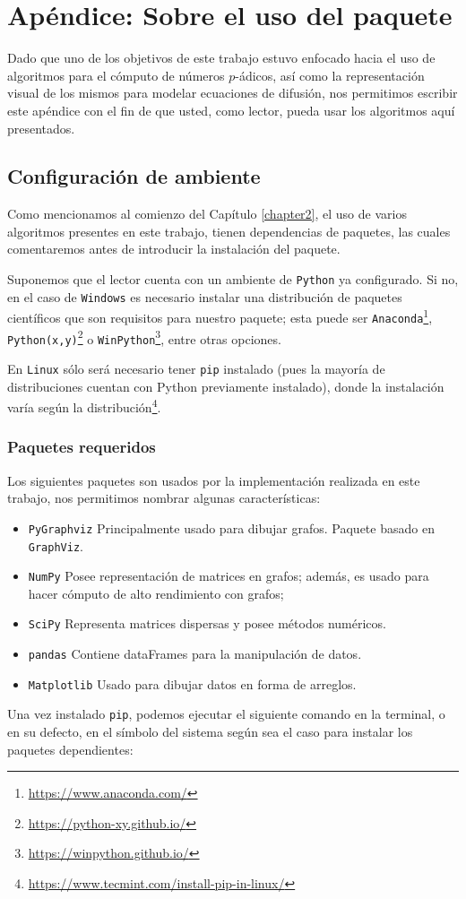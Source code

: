 \chapter{Apéndice: Sobre el uso del paquete}
\label{apendice}
Dado que uno de los objetivos de este trabajo estuvo enfocado hacia el uso de algoritmos para el cómputo de números $p$-ádicos, así como la representación visual de los mismos para modelar ecuaciones de difusión, nos permitimos escribir este apéndice con el fin de que usted, como lector, pueda usar los algoritmos aquí presentados.
\section{Configuración de ambiente}
Como mencionamos al comienzo del Capítulo \ref{chapter2}, el uso de varios algoritmos presentes en este trabajo, tienen dependencias de paquetes, las cuales comentaremos antes de introducir la instalación del paquete.

Suponemos que el lector cuenta con un ambiente de \texttt{Python} ya configurado. Si no, en el caso de \texttt{Windows} es necesario instalar una distribución de paquetes científicos que son requisitos para nuestro paquete; esta puede ser \texttt{Anaconda}\footnote{\url{https://www.anaconda.com/}}, \texttt{Python(x,y)}\footnote{\url{https://python-xy.github.io/}} o \texttt{WinPython}\footnote{\url{https://winpython.github.io/}}, entre otras opciones.

En \texttt{Linux} sólo será necesario tener \texttt{pip} instalado (pues la mayoría de distribuciones cuentan con Python previamente instalado), donde la instalación varía según la distribución\footnote{\url{https://www.tecmint.com/install-pip-in-linux/}}.
\newpage

\subsection*{Paquetes requeridos}
Los siguientes paquetes son usados por la implementación realizada en este trabajo, nos permitimos nombrar algunas características:
\begin{itemize}
	\item\texttt{PyGraphviz} Principalmente usado para dibujar grafos. Paquete basado en \texttt{GraphViz}.
	
	\item\texttt{NumPy} Posee representación de matrices en grafos; además, es usado para hacer cómputo de alto rendimiento con grafos;
	
	\item\texttt{SciPy} Representa matrices dispersas y posee métodos numéricos.
	
	\item\texttt{pandas} Contiene dataFrames para la manipulación de datos.
	
	\item\texttt{Matplotlib} Usado para dibujar datos en forma de arreglos.	
\end{itemize}
Una vez instalado \texttt{pip}, podemos ejecutar el siguiente comando en la terminal, o en su defecto, en el símbolo del sistema según sea el caso para instalar los paquetes dependientes:

